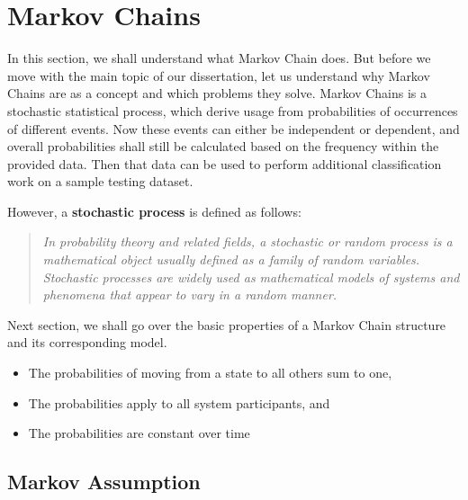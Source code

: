 \chapter{Markov Chains} %
\label{cha:markov-chains} %

In this section, we shall understand what Markov Chain does. But before we move with the main topic of our dissertation, let us understand why Markov Chains are as a concept and which problems they solve. Markov Chains is a stochastic statistical process, which derive usage from probabilities of occurrences of different events. Now these events can either be independent or dependent, and overall probabilities shall still be calculated based on the frequency within the provided data. Then that data can be used to perform additional classification work on a sample testing dataset.

However, a \textbf{stochastic process} is defined as follows:

\vspace*{\fill} 
\begin{quote}
\centering 
\textit{In probability theory and related fields, a stochastic or random process is a mathematical object usually defined as a family of random variables. Stochastic processes are widely used as mathematical models of systems and phenomena that appear to vary in a random manner.}
\end{quote}
\vspace*{\fill}

Next section, we shall go over the basic properties of a Markov Chain structure and its corresponding model.

\begin{itemize}
    \item The probabilities of moving from a state to all others sum to one, 
    \item The probabilities apply to all system participants, and 
    \item The probabilities are constant over time
\end{itemize}

\section{Markov Assumption} %
\label{sec:markov-assumption} %

